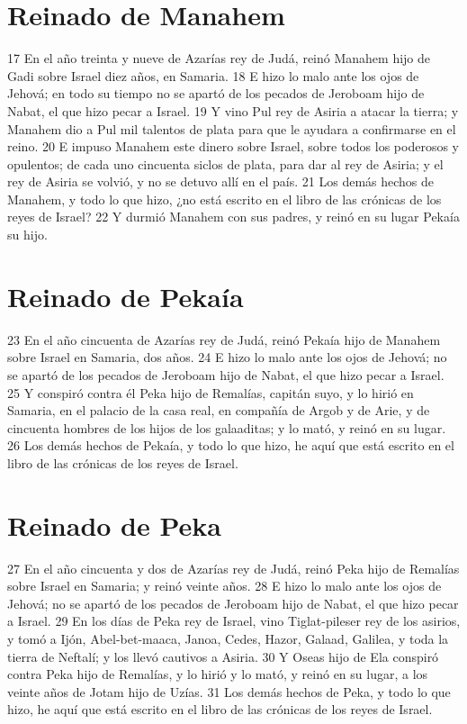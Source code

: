 \section*{Reinado de Manahem}

17 En el año treinta y nueve de Azarías rey de Judá, reinó Manahem hijo de Gadi sobre Israel diez años, en Samaria.
18 E hizo lo malo ante los ojos de Jehová; en todo su tiempo no se apartó de los pecados de Jeroboam hijo de Nabat, el que hizo pecar a Israel.
19 Y vino Pul rey de Asiria a atacar la tierra; y Manahem dio a Pul mil talentos de plata   para que le ayudara a confirmarse en el reino.
20 E impuso Manahem este dinero sobre Israel, sobre todos los poderosos y opulentos; de cada uno cincuenta siclos de plata,   para dar al rey de Asiria; y el rey de Asiria se volvió, y no se detuvo allí en el país.
21 Los demás hechos de Manahem, y todo lo que hizo, ¿no está escrito en el libro de las crónicas de los reyes de Israel?
22 Y durmió Manahem con sus padres, y reinó en su lugar Pekaía su hijo.

\section*{Reinado de Pekaía}

23 En el año cincuenta de Azarías rey de Judá, reinó Pekaía hijo de Manahem sobre Israel en Samaria, dos años.
24 E hizo lo malo ante los ojos de Jehová; no se apartó de los pecados de Jeroboam hijo de Nabat, el que hizo pecar a Israel.
25 Y conspiró contra él Peka hijo de Remalías, capitán suyo, y lo hirió en Samaria, en el palacio de la casa real, en compañía de Argob y de Arie, y de cincuenta hombres de los hijos de los galaaditas; y lo mató, y reinó en su lugar.
26 Los demás hechos de Pekaía, y todo lo que hizo, he aquí que está escrito en el libro de las crónicas de los reyes de Israel.

\section*{Reinado de Peka}

27 En el año cincuenta y dos de Azarías rey de Judá, reinó Peka hijo de Remalías sobre Israel en Samaria; y reinó veinte años.
28 E hizo lo malo ante los ojos de Jehová; no se apartó de los pecados de Jeroboam hijo de Nabat, el que hizo pecar a Israel.
29 En los días de Peka rey de Israel, vino Tiglat-pileser rey de los asirios, y tomó a Ijón, Abel-bet-maaca, Janoa, Cedes, Hazor, Galaad, Galilea, y toda la tierra de Neftalí; y los llevó cautivos a Asiria.
30 Y Oseas hijo de Ela conspiró contra Peka hijo de Remalías, y lo hirió y lo mató, y reinó en su lugar, a los veinte años de Jotam hijo de Uzías.
31 Los demás hechos de Peka, y todo lo que hizo, he aquí que está escrito en el libro de las crónicas de los reyes de Israel.

